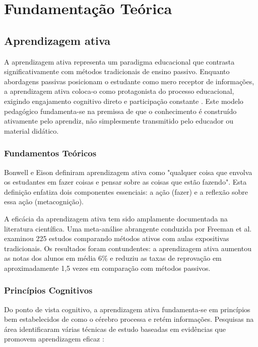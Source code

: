 \documentclass[tcc,capa]{texufpel}
\begin{document}
\chapter{Fundamentação Teórica}


\section{Aprendizagem ativa}

A aprendizagem ativa representa um paradigma educacional que contrasta significativamente com métodos tradicionais de ensino passivo. Enquanto abordagens passivas posicionam o estudante como mero receptor de informações, a aprendizagem ativa coloca-o como protagonista do processo educacional, exigindo engajamento cognitivo direto e participação constante \cite{freeman2014active}. Este modelo pedagógico fundamenta-se na premissa de que o conhecimento é construído ativamente pelo aprendiz, não simplesmente transmitido pelo educador ou material didático.

\subsection{Fundamentos Teóricos}

Bonwell e Eison \cite{bonwell1991active} definiram aprendizagem ativa como "qualquer coisa que envolva os estudantes em fazer coisas e pensar sobre as coisas que estão fazendo". Esta definição enfatiza dois componentes essenciais: a ação (fazer) e a reflexão sobre essa ação (metacognição).

A eficácia da aprendizagem ativa tem sido amplamente documentada na literatura científica. Uma meta-análise abrangente conduzida por Freeman et al.~\cite{freeman2014active} examinou 225 estudos comparando métodos ativos com aulas expositivas tradicionais. Os resultados foram contundentes: a aprendizagem ativa aumentou as notas dos alunos em média 6\% e reduziu as taxas de reprovação em aproximadamente 1,5 vezes em comparação com métodos passivos.

\subsection{Princípios Cognitivos}

Do ponto de vista cognitivo, a aprendizagem ativa fundamenta-se em princípios bem estabelecidos de como o cérebro processa e retém informações. Pesquisas na área identificaram várias técnicas de estudo baseadas em evidências que promovem aprendizagem eficaz \cite{dunlosky2013improving}:
\end{document}
